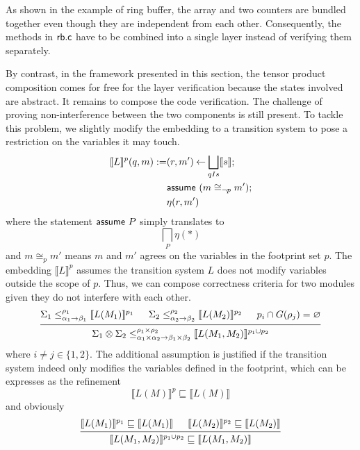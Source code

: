 \documentclass[sigplan,10pt,authordraft]{acmart}
\begin{document}
As shown in the example of ring buffer,
the array and two counters are bundled together
even though they are independent from each other.
Consequently, the methods in $ \mathsf{rb.c} $
have to be combined into a single layer
instead of verifying them separately.

By contrast,
in the framework presented in this section,
the tensor product composition comes for free
for the layer verification 
because the states involved are abstract.
It remains to compose the code verification.
The challenge of proving non-interference
between the two components is still present.
To tackle this problem,
we slightly modify the embedding to a transition system
to pose a restriction on the variables it may touch.
\begin{align*}
  \llbracket L \rrbracket^p (q,m) :=
  & (r, m') \mathbin\leftarrow \bigsqcup_{q \mathrel{I} s} \llbracket s \rrbracket \mathbin;\\
  &  \mathsf{assume} \ (m \cong_{\neg p} m');\\
  & \eta(r, m')
\end{align*}
where the statement $ \mathsf{assume} \ P$
simply translates to
\[
  \bigsqcap_{P} \eta(*)
\]
and $m \cong_p m'$ means $m$ and $m'$ agrees
on the variables in the footprint set $p$.
The embedding $\llbracket L \rrbracket^p$
assumes the transition system $L$
does not modify variables
outside the scope of $p$.
Thus, we can compose correctness criteria for two modules
given they do not interfere with each other.
\[
  \begin{prooftree}
    \hypo{\Sigma_1 \le^{\rho_1}_{\alpha_1 \rightarrow \beta_1} \llbracket L(M_1) \rrbracket^{p_1}}
    \hypo{\Sigma_2 \le^{\rho_2}_{\alpha_2 \rightarrow \beta_2} \llbracket L(M_2) \rrbracket^{p_2}}
    \hypo{p_i \cap G(\rho_j) = \varnothing}
    \infer3{\Sigma_1 \otimes \Sigma_2
      \le^{\rho_1 \times \rho_2}_{\alpha_1\times\alpha_2 \rightarrow \beta_1\times\beta_2}
      \llbracket L(M_1, M_2) \rrbracket^{p_1 \cup p_2}}
  \end{prooftree}
\]
where $i \neq j \in \{1,2\}$.
The additional assumption is justified
if the transition system
indeed only modifies the variables defined in the footprint,
which can be expresses as the refinement
\[
  \llbracket L(M) \rrbracket^p \sqsubseteq \llbracket L(M) \rrbracket
\]
and obviously
\[
  \begin{prooftree}
    \hypo{\llbracket L(M_1) \rrbracket^{p_1} \sqsubseteq \llbracket L(M_1) \rrbracket}
    \hypo{\llbracket L(M_2) \rrbracket^{p_2} \sqsubseteq \llbracket L(M_2) \rrbracket}
    \infer2{\llbracket L(M_1, M_2) \rrbracket^{p_1 \cup p_2} \sqsubseteq \llbracket L(M_1, M_2) \rrbracket}
  \end{prooftree}
\]
\end{document}
